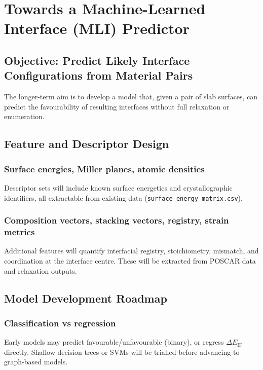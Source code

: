 \section{Towards a Machine-Learned Interface (MLI) Predictor}

\subsection{Objective: Predict Likely Interface Configurations from Material Pairs}

The longer-term aim is to develop a model that, given a pair of slab surfaces, can predict the favourability of resulting interfaces without full relaxation or enumeration.

\subsection{Feature and Descriptor Design}

\subsubsection{Surface energies, Miller planes, atomic densities}

Descriptor sets will include known surface energetics and crystallographic identifiers, all extractable from existing data (\texttt{surface\_energy\_matrix.csv}).

\subsubsection{Composition vectors, stacking vectors, registry, strain metrics}

Additional features will quantify interfacial registry, stoichiometry, mismatch, and coordination at the interface centre. These will be extracted from POSCAR data and relaxation outputs.

\subsection{Model Development Roadmap}

\subsubsection{Classification vs regression}

Early models may predict favourable/unfavourable (binary), or regress $\Delta E_\mathrm{IF}$ directly. Shallow decision trees or SVMs will be trialled before advancing to graph-based models.

